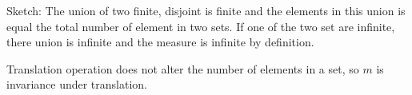 \begin{solution}
    Sketch: 
    The union of two finite, disjoint is finite and the elements in this union is equal the total number of element in two sets.
    If one of the two set are infinite, there union is infinite and the measure is infinite by definition. 
    
    Translation operation does not alter the number of elements in a set, so $m$ is invariance under translation.
\end{solution}

